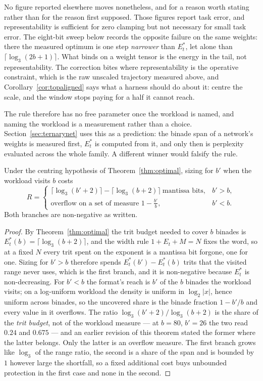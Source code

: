 No figure reported elsewhere moves nonetheless, and for a reason worth stating
rather than for the reason first supposed. Those figures report task error, and
representability is sufficient for zero clamping but not necessary for small task
error. The eight-bit sweep below records the opposite failure on the same weights:
there the measured optimum is one step \emph{narrower} than $E_t^{*}$, let alone
than $\lceil\log_3(2b+1)\rceil$. What binds on a weight tensor is the energy in the
tail, not representability. The correction bites where representability is the
operative constraint, which is the raw unscaled trajectory measured above, and
Corollary~\ref{cor:topaligned} says what a harness should do about it: centre the
scale, and the window stops paying for a half it cannot reach.

The rule therefore has no free parameter once the workload is named, and naming
the workload is a measurement rather than a choice. Section~\ref{sec:ternarynet}
uses this as a prediction: the binade span of a network's weights is measured
first, $E_t^{*}$ is computed from it, and only then is perplexity evaluated across
the whole family. A different winner would falsify the rule.

\begin{theorem}
\label{thm:regret}
Under the centring hypothesis of Theorem~\ref{thm:optimal}, sizing for $b'$ when
the workload visits $b$ costs
\[
  R =
  \begin{cases}
    \lceil\log_3(b'+2)\rceil - \lceil\log_3(b+2)\rceil \ \text{mantissa bits}, & b' > b,\\[2pt]
    \text{overflow on a set of measure } 1 - \tfrac{b'}{b}, & b' < b .
  \end{cases}
\]
Both branches are non-negative as written.
\end{theorem}

\begin{proof}
By Theorem~\ref{thm:optimal} the trit budget needed to cover $b$ binades is
$E_t^{*}(b) = \lceil\log_3(b+2)\rceil$, and the width rule $1 + E_t + M = N$ fixes
the word, so at a fixed $N$ every trit spent on the exponent is a mantissa bit
forgone, one for one. Sizing for $b' > b$ therefore spends
$E_t^{*}(b') - E_t^{*}(b)$ trits that the visited range never uses, which is the
first branch, and it is non-negative because $E_t^{*}$ is non-decreasing. For
$b' < b$ the format's reach is $b'$ of the $b$ binades the workload visits; on a
log-uniform workload the density is uniform in $\log_2|x|$, hence uniform across
binades, so the uncovered share is the binade fraction $1 - b'/b$ and every value
in it overflows. The ratio $\log_3(b'+2)/\log_3(b+2)$ is the share of the
\emph{trit budget}, not of the workload measure --- at $b = 80$, $b' = 26$ the two
read $0.24$ and $0.675$ --- and an earlier revision of this theorem stated the
former where the latter belongs. Only the latter is an overflow measure. The first
branch grows like $\log_3$ of the range ratio, the second is a share of the span
and is bounded by $1$ however large the shortfall, so a fixed additional cost buys
unbounded protection in the first case and none in the second.
\end{proof}

